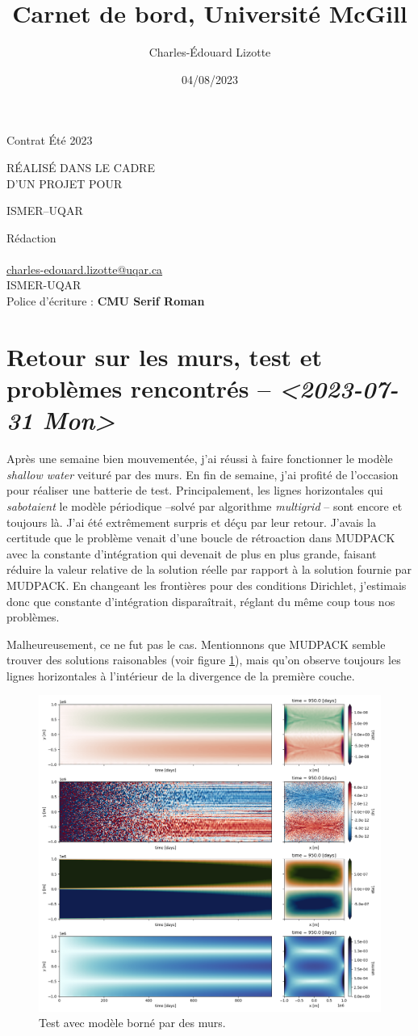 \documentclass[10pt]{article}
\author{Charles-Édouard Lizotte}
\date{04/08/2023}
\title{Carnet de bord, Université McGill}
\makeatletter
\numberwithin{equation}{section}
\newcommand{\mytitlepage}{
\begin{titlepage}
\begin{center}
{\Huge \thesubtitle \par}
\vspace{2cm}
{\Huge \MakeUppercase{\thetitle} \par}
\vspace{2cm}
RÉALISÉ DANS LE CADRE\\ D'UN PROJET POUR \par
\vspace{2cm}
{\Huge ISMER--UQAR \par}
\vspace{2cm}
{\thedate}
\end{center}
\vfill
Rédaction \\
{\theauthor}\\
\url{charles-edouard.lizotte@uqar.ca}\\
ISMER-UQAR\\
Police d'écriture : \textbf{CMU Serif Roman}
\end{titlepage}
}
\newcommand{\thesubtitle}{Contrat Été 2023}
\makeatother
\begin{document}
\mytitlepage
\tableofcontents\newpage


\section{Retour sur les murs, test et problèmes rencontrés -- \textit{<2023-07-31 Mon>}}
\label{sec:org36dd111}

Après une semaine bien mouvementée, j'ai réussi à faire fonctionner le modèle \emph{shallow water} veituré par des murs.
En fin de semaine, j'ai profité de l'occasion pour réaliser une batterie de test.
Principalement, les lignes horizontales qui \emph{sabotaient} le modèle périodique --solvé par algorithme \emph{multigrid} -- sont encore et toujours là.
J'ai été extrêmement surpris et déçu par leur retour.
J'avais la certitude que le problème venait d'une boucle de rétroaction dans MUDPACK avec la constante d'intégration qui devenait de plus en plus grande, faisant réduire la valeur relative de la solution réelle par rapport à la solution fournie par MUDPACK.
En changeant les frontières pour des conditions Dirichlet, j'estimais donc que constante d'intégration disparaîtrait, réglant du même coup tous nos problèmes.\bigskip

Malheureusement, ce ne fut pas le cas.
Mentionnons que MUDPACK semble trouver des solutions raisonables (voir figure \ref{fig:org3d61ae2}), mais qu'on observe toujours les lignes horizontales à l'intérieur de la divergence de la première couche.

\begin{figure}[htbp]
\centering
\includegraphics[width=.9\linewidth]{figures/tests/2023-07-31_hovmoller1_t=950days.png}
\caption{\label{fig:org3d61ae2}Test avec modèle borné par des murs.}
\end{figure}
\newpage
\end{document}
